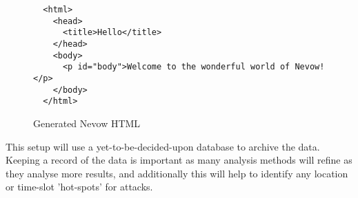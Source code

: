 \begin{figure}[h!]
  \lstset{language=html}
  \begin{lstlisting}
  <html>
    <head>
      <title>Hello</title>
    </head>
    <body>
      <p id="body">Welcome to the wonderful world of Nevow!</p>
    </body>
  </html>
  \end{lstlisting}
  \label{fig:nevow-html}
  \caption{Generated Nevow HTML}
\end{figure} 

This setup will use a yet-to-be-decided-upon database to archive the data. Keeping a record of the data is important as many analysis methods will refine as they analyse more results, and additionally this will help to identify any location or time-slot 'hot-spots' for attacks.  